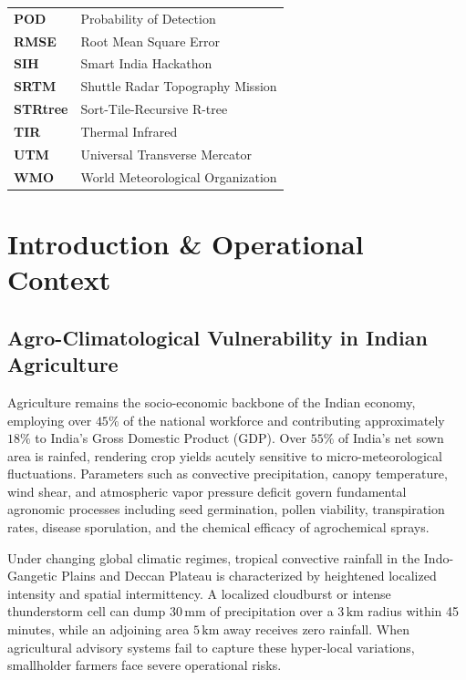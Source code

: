 \documentclass[11pt,a4paper,oneside]{report}
\begin{document}
\begin{tabular}{ll}
\textbf{POD} & Probability of Detection \\
\textbf{RMSE} & Root Mean Square Error \\
\textbf{SIH} & Smart India Hackathon \\
\textbf{SRTM} & Shuttle Radar Topography Mission \\
\textbf{STRtree} & Sort-Tile-Recursive R-tree \\
\textbf{TIR} & Thermal Infrared \\
\textbf{UTM} & Universal Transverse Mercator \\
\textbf{WMO} & World Meteorological Organization \\
\end{tabular}

\chapter{Introduction \& Operational Context}

\section{Agro-Climatological Vulnerability in Indian Agriculture}
Agriculture remains the socio-economic backbone of the Indian economy, employing over $45\%$ of the national workforce and contributing approximately $18\%$ to India's Gross Domestic Product (GDP). Over $55\%$ of India's net sown area is rainfed, rendering crop yields acutely sensitive to micro-meteorological fluctuations. Parameters such as convective precipitation, canopy temperature, wind shear, and atmospheric vapor pressure deficit govern fundamental agronomic processes including seed germination, pollen viability, transpiration rates, disease sporulation, and the chemical efficacy of agrochemical sprays.

Under changing global climatic regimes, tropical convective rainfall in the Indo-Gangetic Plains and Deccan Plateau is characterized by heightened localized intensity and spatial intermittency. A localized cloudburst or intense thunderstorm cell can dump $30\,\text{mm}$ of precipitation over a $3\,\text{km}$ radius within 45 minutes, while an adjoining area $5\,\text{km}$ away receives zero rainfall. When agricultural advisory systems fail to capture these hyper-local variations, smallholder farmers face severe operational risks.
\end{document}
